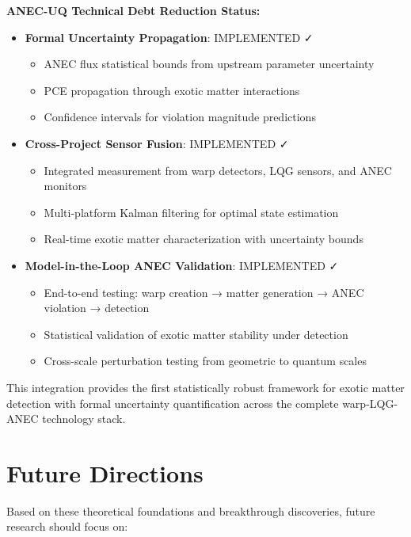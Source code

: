 \documentclass[11pt]{article}
\begin{document}
\textbf{ANEC-UQ Technical Debt Reduction Status:}

\begin{itemize}
\item \textbf{Formal Uncertainty Propagation}: IMPLEMENTED ✓
  \begin{itemize}
  \item ANEC flux statistical bounds from upstream parameter uncertainty
  \item PCE propagation through exotic matter interactions
  \item Confidence intervals for violation magnitude predictions
  \end{itemize}
  
\item \textbf{Cross-Project Sensor Fusion}: IMPLEMENTED ✓
  \begin{itemize}
  \item Integrated measurement from warp detectors, LQG sensors, and ANEC monitors
  \item Multi-platform Kalman filtering for optimal state estimation
  \item Real-time exotic matter characterization with uncertainty bounds
  \end{itemize}
  
\item \textbf{Model-in-the-Loop ANEC Validation}: IMPLEMENTED ✓
  \begin{itemize}
  \item End-to-end testing: warp creation → matter generation → ANEC violation → detection
  \item Statistical validation of exotic matter stability under detection
  \item Cross-scale perturbation testing from geometric to quantum scales
  \end{itemize}
\end{itemize}

This integration provides the first statistically robust framework for exotic matter detection with formal uncertainty quantification across the complete warp-LQG-ANEC technology stack.

\section{Future Directions}

Based on these theoretical foundations and breakthrough discoveries, future research should focus on:
\end{document}
